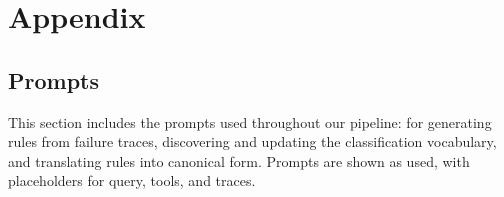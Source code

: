 \documentclass[11pt]{article}
\begin{document}



\clearpage
\appendix
\section{Appendix}



%
%

\subsection{Prompts}
\label{app:prompts}

This section includes the prompts used throughout our pipeline: for generating rules from failure traces, discovering and updating the classification vocabulary, and translating rules into canonical form. Prompts are shown as used, with placeholders for query, tools, and traces.


\lstset{inputencoding=utf8}
\end{document}

